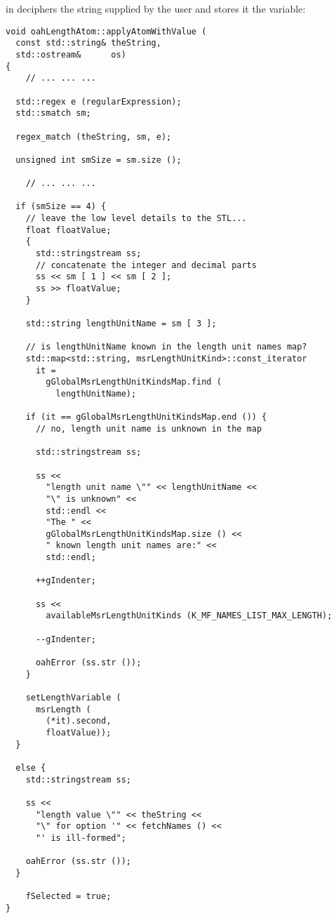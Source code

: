  in  deciphers the string supplied by the user and stores it the  variable:
\begin{lstlisting}[language=CPlusPlus]
void oahLengthAtom::applyAtomWithValue (
  const std::string& theString,
  std::ostream&      os)
{
	// ... ... ...

  std::regex e (regularExpression);
  std::smatch sm;

  regex_match (theString, sm, e);

  unsigned int smSize = sm.size ();

	// ... ... ...

  if (smSize == 4) {
    // leave the low level details to the STL...
    float floatValue;
    {
      std::stringstream ss;
      // concatenate the integer and decimal parts
      ss << sm [ 1 ] << sm [ 2 ];
      ss >> floatValue;
    }

    std::string lengthUnitName = sm [ 3 ];

    // is lengthUnitName known in the length unit names map?
    std::map<std::string, msrLengthUnitKind>::const_iterator
      it =
        gGlobalMsrLengthUnitKindsMap.find (
          lengthUnitName);

    if (it == gGlobalMsrLengthUnitKindsMap.end ()) {
      // no, length unit name is unknown in the map

      std::stringstream ss;

      ss <<
        "length unit name \"" << lengthUnitName <<
        "\" is unknown" <<
        std::endl <<
        "The " <<
        gGlobalMsrLengthUnitKindsMap.size () <<
        " known length unit names are:" <<
        std::endl;

      ++gIndenter;

      ss <<
        availableMsrLengthUnitKinds (K_MF_NAMES_LIST_MAX_LENGTH);

      --gIndenter;

      oahError (ss.str ());
    }

    setLengthVariable (
      msrLength (
        (*it).second,
        floatValue));
  }

  else {
    std::stringstream ss;

    ss <<
      "length value \"" << theString <<
      "\" for option '" << fetchNames () <<
      "' is ill-formed";

    oahError (ss.str ());
  }

	fSelected = true;
}
\end{lstlisting}

